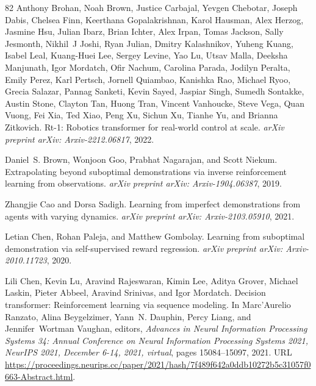 \documentclass{article}
\begin{document}
\begin{thebibliography}{82}
Anthony Brohan, Noah Brown, Justice Carbajal, Yevgen Chebotar, Joseph Dabis, Chelsea Finn, Keerthana Gopalakrishnan, Karol Hausman, Alex Herzog, Jasmine Hsu, Julian Ibarz, Brian Ichter, Alex Irpan, Tomas Jackson, Sally Jesmonth, Nikhil~J Joshi, Ryan Julian, Dmitry Kalashnikov, Yuheng Kuang, Isabel Leal, Kuang-Huei Lee, Sergey Levine, Yao Lu, Utsav Malla, Deeksha Manjunath, Igor Mordatch, Ofir Nachum, Carolina Parada, Jodilyn Peralta, Emily Perez, Karl Pertsch, Jornell Quiambao, Kanishka Rao, Michael Ryoo, Grecia Salazar, Pannag Sanketi, Kevin Sayed, Jaspiar Singh, Sumedh Sontakke, Austin Stone, Clayton Tan, Huong Tran, Vincent Vanhoucke, Steve Vega, Quan Vuong, Fei Xia, Ted Xiao, Peng Xu, Sichun Xu, Tianhe Yu, and Brianna Zitkovich.
\newblock Rt-1: Robotics transformer for real-world control at scale.
\newblock \emph{arXiv preprint arXiv: Arxiv-2212.06817}, 2022.

Daniel~S. Brown, Wonjoon Goo, Prabhat Nagarajan, and Scott Niekum.
\newblock Extrapolating beyond suboptimal demonstrations via inverse reinforcement learning from observations.
\newblock \emph{arXiv preprint arXiv: Arxiv-1904.06387}, 2019.

Zhangjie Cao and Dorsa Sadigh.
\newblock Learning from imperfect demonstrations from agents with varying dynamics.
\newblock \emph{arXiv preprint arXiv: Arxiv-2103.05910}, 2021.

Letian Chen, Rohan Paleja, and Matthew Gombolay.
\newblock Learning from suboptimal demonstration via self-supervised reward regression.
\newblock \emph{arXiv preprint arXiv: Arxiv-2010.11723}, 2020.

Lili Chen, Kevin Lu, Aravind Rajeswaran, Kimin Lee, Aditya Grover, Michael Laskin, Pieter Abbeel, Aravind Srinivas, and Igor Mordatch.
\newblock Decision transformer: Reinforcement learning via sequence modeling.
\newblock In Marc'Aurelio Ranzato, Alina Beygelzimer, Yann~N. Dauphin, Percy Liang, and Jennifer~Wortman Vaughan, editors, \emph{Advances in Neural Information Processing Systems 34: Annual Conference on Neural Information Processing Systems 2021, NeurIPS 2021, December 6-14, 2021, virtual}, pages 15084--15097, 2021.
\newblock URL \url{https://proceedings.neurips.cc/paper/2021/hash/7f489f642a0ddb10272b5c31057f0663-Abstract.html}.


\end{thebibliography}
\end{document}
